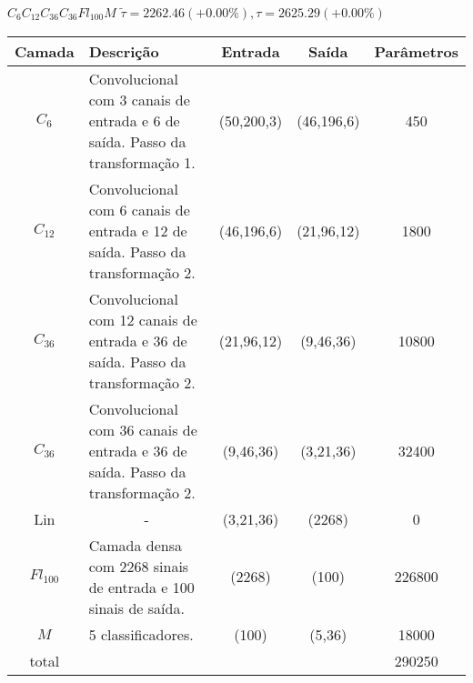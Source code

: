 \begin{tiny}
\begin{table}[H]
	$C_6C_{12}C_{36}C_{36}Fl_{100}M$ $\tilde{\tau}=2262.46 (+0.00\%), \tau=2625.29 (+0.00\%)$\newline
	\begin{tabularx}{\linewidth}{ |c|X|c|c|c| }
		\hline
		Camada & Descrição & Entrada & Saída & Parâmetros \\ \hline
		$C_{6}$ & Convolucional com 3 canais de entrada e 6 de saída. Passo da transformação 1. & (50,200,3) & (46,196,6) & 450 \\ \hline
		$C_{12}$ & Convolucional com 6 canais de entrada e 12 de saída. Passo da transformação 2. & (46,196,6) & (21,96,12) & 1800 \\ \hline
		$C_{36}$ & Convolucional com 12 canais de entrada e 36 de saída. Passo da transformação 2. & (21,96,12) & (9,46,36) & 10800 \\ \hline
		$C_{36}$ & Convolucional com 36 canais de entrada e 36 de saída. Passo da transformação 2. & (9,46,36) & (3,21,36) & 32400 \\ \hline
		Lin & \multicolumn{1}{c|}{-} & (3,21,36) & (2268) & 0 \\ \hline
		$Fl_{100}$ & Camada densa com 2268 sinais de entrada e 100 sinais de saída. & (2268) & (100) & 226800 \\ \hline
		$M$ & 5 classificadores. & (100) & (5,36) & 18000 \\ \hline
		total &  &  &  & 290250 \\ \hline
	\end{tabularx}
\end{table}


\end{tiny}
